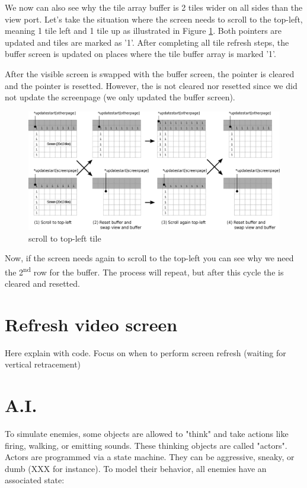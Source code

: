 \documentclass[book.tex]{subfiles}
\begin{document}
\pagebreak
We now can also see why the tile array buffer is 2 tiles wider on all sides than the view port. Let's take the situation where the screen needs to scroll to the top-left, meaning 1 tile left and 1 tile up as illustrated in Figure \ref{fig:buffer_tile_move_1}. Both  pointers are updated and tiles are marked as '1'. After completing all tile refresh steps, the buffer screen is updated on places where the tile buffer array is marked '1'. \\
\par
After the visible screen is swapped with the buffer screen, the  pointer is cleared and the pointer is resetted. However, the  is not cleared nor resetted since we did not update the screenpage (we only updated the buffer screen).\\
\begin{figure}[H]
  \centering
  \includegraphics[width=\textwidth]{imgs/drawings/buffer_tile_move.eps}
  \caption{scroll to top-left tile}
  \label{fig:buffer_tile_move_1}
\end{figure}
Now, if the screen needs again to scroll to the top-left you can see why we need the 2\textsuperscript{nd} row for the buffer. The process will repeat, but after this cycle the  is cleared and resetted.\\
\pagebreak





\section{Refresh video screen}
Here explain with code. Focus on when to perform screen refresh (waiting for vertical retracement)

\section{A.I.}
To simulate enemies, some objects are allowed to "think" and take actions like firing, walking,
or emitting sounds. These thinking objects are called "actors".
Actors are programmed via a state machine. They can be aggressive, sneaky, or dumb
(XXX for instance). To model their behavior, all enemies have an associated state:
\end{document}
